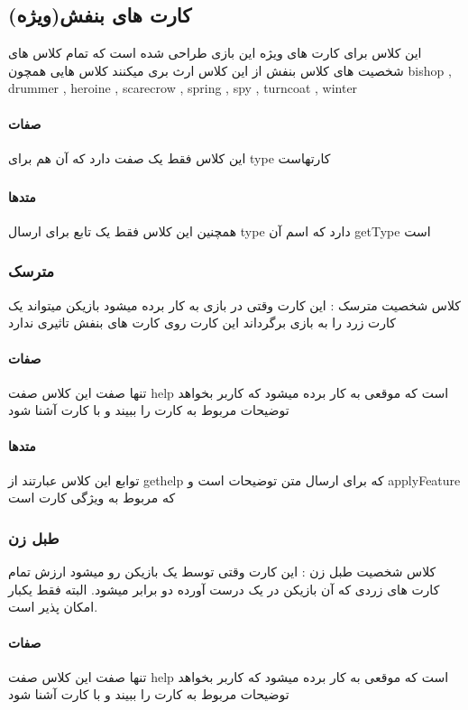 \documentclass[pdf,titlepage,a4paper]{report}
\begin{document}
	\subsection{کارت های بنفش(ویژه)}
	این کلاس برای کارت های ویژه این بازی طراحی شده است که تمام کلاس های شخصیت های کلاس بنفش از این کلاس ارث بری میکنند
	کلاس هایی همچون bishop , drummer , heroine , scarecrow , spring , spy , turncoat , winter  
	\paragraph{صفات}
	این کلاس فقط یک صفت دارد که آن هم برای type  کارتهاست
	\subparagraph{}
	
	\paragraph{متدها}
	همچنین این کلاس فقط یک تابع برای ارسال type دارد که اسم آن getType است
	\subsubsection{مترسک}
	کلاس شخصیت مترسک : این کارت وقتی در بازی به کار برده میشود بازیکن میتواند یک کارت زرد را به بازی برگرداند 
	این کارت روی کارت های بنفش تاثیری ندارد
	\paragraph{صفات}
	 تنها  صفت این کلاس صفت help  است که موقعی به کار برده میشود که کاربر بخواهد توضیحات مربوط به کارت را ببیند و با کارت آشنا شود
	 
	 \paragraph{متدها}
	 توابع این کلاس عبارتند از  
	 gethelp که برای ارسال متن توضیحات است 
	 و applyFeature که مربوط به ویژگی کارت است
	\subsubsection{طبل زن}
	 کلاس شخصیت طبل زن : این کارت وقتی توسط یک بازیکن رو میشود ارزش تمام کارت های زردی که آن بازیکن در یک درست آورده دو برابر میشود. البته فقط یکبار امکان پذیر است.

    \paragraph{صفات}
	تنها  صفت این کلاس صفت help  است که موقعی به کار برده میشود که کاربر بخواهد توضیحات مربوط به کارت را ببیند و با کارت آشنا شود
\end{document}

